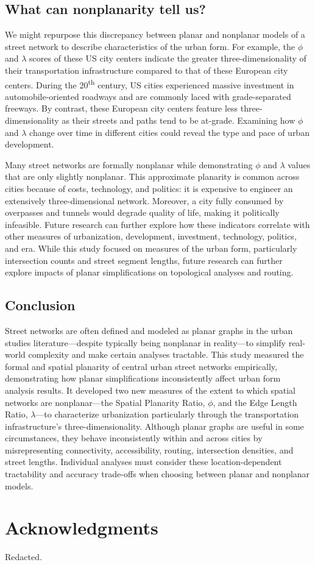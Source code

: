 \documentclass[Afour,sageh,times]{sagej}
\begin{document}
\subsection{What can nonplanarity tell us?}

We might repurpose this discrepancy between planar and nonplanar models of a street network to describe characteristics of the urban form. For example, the $\phi$ and $\lambda$ scores of these US city centers indicate the greater three-dimensionality of their transportation infrastructure compared to that of these European city centers. During the 20\textsuperscript{th} century, US cities experienced massive investment in automobile-oriented roadways and are commonly laced with grade-separated freeways. By contrast, these European city centers feature less three-dimensionality as their streets and paths tend to be at-grade. Examining how $\phi$ and $\lambda$ change over time in different cities could reveal the type and pace of urban development.

Many street networks are formally nonplanar while demonstrating $\phi$ and $\lambda$ values that are only slightly nonplanar. This approximate planarity is common across cities because of costs, technology, and politics: it is expensive to engineer an extensively three-dimensional network. Moreover, a city fully consumed by overpasses and tunnels would degrade quality of life, making it politically infeasible. Future research can further explore how these indicators correlate with other measures of urbanization, development, investment, technology, politics, and era. While this study focused on measures of the urban form, particularly intersection counts and street segment lengths, future research can further explore impacts of planar simplifications on topological analyses and routing.

\subsection{Conclusion}

Street networks are often defined and modeled as planar graphs in the urban studies literature---despite typically being nonplanar in reality---to simplify real-world complexity and make certain analyses tractable. This study measured the formal and spatial planarity of central urban street networks empirically, demonstrating how planar simplifications inconsistently affect urban form analysis results. It developed two new measures of the extent to which spatial networks are nonplanar---the Spatial Planarity Ratio, $\phi$, and the Edge Length Ratio, $\lambda$---to characterize urbanization particularly through the transportation infrastructure's three-dimensionality. Although planar graphs are useful in some circumstances, they behave inconsistently within and across cities by misrepresenting connectivity, accessibility, routing, intersection densities, and street lengths. Individual analyses must consider these location-dependent tractability and accuracy trade-offs when choosing between planar and nonplanar models.



\section{Acknowledgments}

Redacted.





\end{document}
